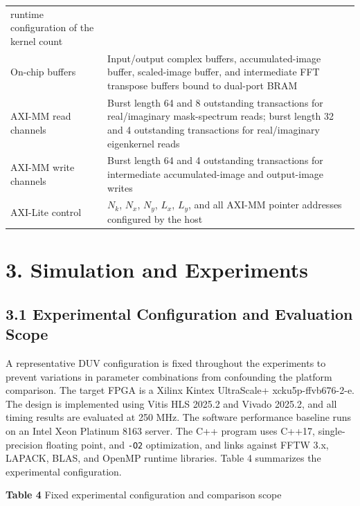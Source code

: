 \documentclass[
  preprint]{elsarticle}
\begin{document}
{\begin{longtable}[]{@{}
  >{\raggedright\arraybackslash}p{}
  >{\raggedright\arraybackslash}p{}@{}}
runtime configuration of the kernel count \\
On-chip buffers & Input/output complex buffers, accumulated-image
buffer, scaled-image buffer, and intermediate FFT transpose buffers
bound to dual-port BRAM \\
AXI-MM read channels & Burst length 64 and 8 outstanding transactions
for real/imaginary mask-spectrum reads; burst length 32 and 4
outstanding transactions for real/imaginary eigenkernel reads \\
AXI-MM write channels & Burst length 64 and 4 outstanding transactions
for intermediate accumulated-image and output-image writes \\
AXI-Lite control & \(N_k\), \(N_x\), \(N_y\), \(L_x\), \(L_y\), and all
AXI-MM pointer addresses configured by the host \\
\end{longtable}
}

\section{3. Simulation and
Experiments}\label{simulation-and-experiments}

\subsection{3.1 Experimental Configuration and Evaluation
Scope}\label{experimental-configuration-and-evaluation-scope}

A representative DUV configuration is fixed throughout the experiments
to prevent variations in parameter combinations from confounding the
platform comparison. The target FPGA is a Xilinx Kintex UltraScale+
xcku5p-ffvb676-2-e. The design is implemented using Vitis HLS 2025.2 and
Vivado 2025.2, and all timing results are evaluated at 250 MHz. The
software performance baseline runs on an Intel Xeon Platinum 8163
server. The C++ program uses C++17, single-precision floating point, and
\texttt{-O2} optimization, and links against FFTW 3.x, LAPACK, BLAS, and
OpenMP runtime libraries. Table 4 summarizes the experimental
configuration.

\textbf{Table 4} Fixed experimental configuration and comparison scope
\end{document}
